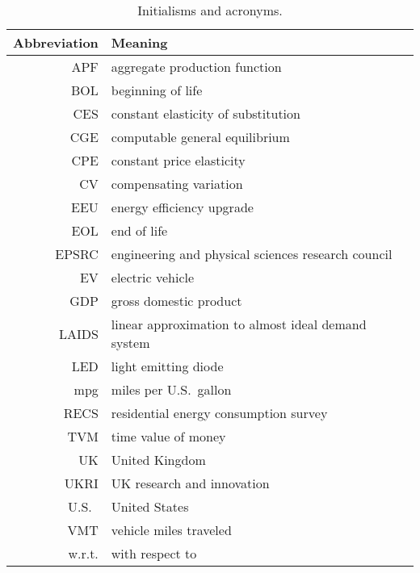 \begin{table}
\footnotesize
\centering %
\caption{Initialisms and acronyms.}
\begin{tabular}{r l}
  \toprule
  Abbreviation & Meaning \\
  \midrule
  APF    & aggregate production function \\
  BOL    & beginning of life \\
  CES    & constant elasticity of substitution \\
  CGE    & computable general equilibrium \\
  CPE    & constant price elasticity \\
  CV     & compensating variation \\
  EEU    & energy efficiency upgrade \\
  EOL    & end of life \\
  EPSRC  & engineering and physical sciences research council \\
  EV     & electric vehicle \\
  GDP    & gross domestic product \\
  LAIDS  & linear approximation to almost ideal demand system \\
  LED    & light emitting diode \\
  mpg    & miles per U.S.\ gallon \\
  RECS   & residential energy consumption survey \\
  TVM    & time value of money \\
  UK     & United Kingdom \\
  UKRI   & UK research and innovation \\
  U.S.\  & United States \\
  VMT    & vehicle miles traveled \\
  w.r.t. & with respect to \\
  \bottomrule
\end{tabular}
\label{tab:initialisms}
\end{table}



